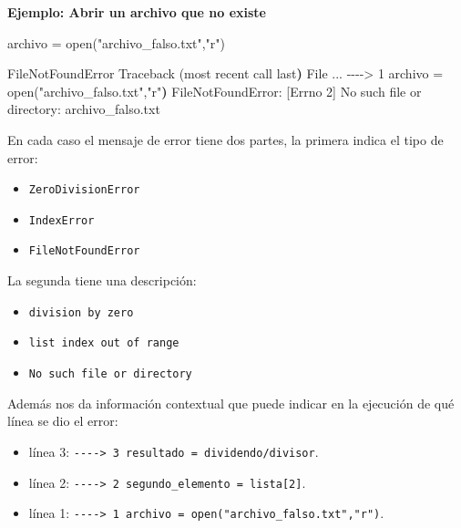 \documentclass[
  letterpaper,
  DIV=11,
  numbers=noendperiod]{scrreprt}
\newenvironment{Shaded}{\begin{snugshade}}{\end{snugshade}}
\newcommand{\BuiltInTok}[1]{\textcolor[rgb]{0.00,0.23,0.31}{#1}}
\newcommand{\ErrorTok}[1]{\textcolor[rgb]{0.68,0.00,0.00}{#1}}
\newcommand{\ExtensionTok}[1]{\textcolor[rgb]{0.00,0.23,0.31}{#1}}
\newcommand{\KeywordTok}[1]{\textcolor[rgb]{0.00,0.23,0.31}{\textbf{#1}}}
\newcommand{\NormalTok}[1]{\textcolor[rgb]{0.00,0.23,0.31}{#1}}
\newcommand{\OperatorTok}[1]{\textcolor[rgb]{0.37,0.37,0.37}{#1}}
\newcommand{\StringTok}[1]{\textcolor[rgb]{0.13,0.47,0.30}{#1}}
\providecommand{\tightlist}{%
  \setlength{\itemsep}{0pt}\setlength{\parskip}{0pt}}\usepackage{longtable,booktabs,array}
\begin{document}
\textbf{Ejemplo: Abrir un archivo que no existe}

\begin{Shaded}
\begin{Highlighting}[]
\NormalTok{archivo }\OperatorTok{=} \BuiltInTok{open}\NormalTok{(}\StringTok{"archivo\_falso.txt"}\NormalTok{,}\StringTok{"r"}\NormalTok{)}
\end{Highlighting}
\end{Shaded}

\begin{Shaded}
\begin{Highlighting}[]
\ExtensionTok{FileNotFoundError}\NormalTok{                         Traceback }\ErrorTok{(}\ExtensionTok{most}\NormalTok{ recent call last}\KeywordTok{)}
\ExtensionTok{File}\NormalTok{ ...}
\ExtensionTok{{-}{-}{-}{-}}\OperatorTok{\textgreater{}}\NormalTok{ 1 archivo = open}\ErrorTok{(}\StringTok{"archivo\_falso.txt"}\ExtensionTok{,}\StringTok{"r"}\KeywordTok{)}
\ExtensionTok{FileNotFoundError:}\NormalTok{ [Errno 2] No such file or directory: }\StringTok{\textquotesingle{}archivo\_falso.txt\textquotesingle{}}
\end{Highlighting}
\end{Shaded}

En cada caso el mensaje de error tiene dos partes, la primera indica el
tipo de error:

\begin{itemize}
\tightlist
\item
  \texttt{ZeroDivisionError}
\item
  \texttt{IndexError}
\item
  \texttt{FileNotFoundError}
\end{itemize}

La segunda tiene una descripción:

\begin{itemize}
\tightlist
\item
  \texttt{division\ by\ zero}
\item
  \texttt{list\ index\ out\ of\ range}
\item
  \texttt{No\ such\ file\ or\ directory}
\end{itemize}

Además nos da información contextual que puede indicar en la ejecución
de qué línea se dio el error:

\begin{itemize}
\tightlist
\item
  línea 3:
  \texttt{-\/-\/-\/-\textgreater{}\ 3\ resultado\ =\ dividendo/divisor}.
\item
  línea 2:
  \texttt{-\/-\/-\/-\textgreater{}\ 2\ segundo\_elemento\ =\ lista{[}2{]}}.
\item
  línea 1:
  \texttt{-\/-\/-\/-\textgreater{}\ 1\ archivo\ =\ open("archivo\_falso.txt","r")}.
\end{itemize}
\end{document}
